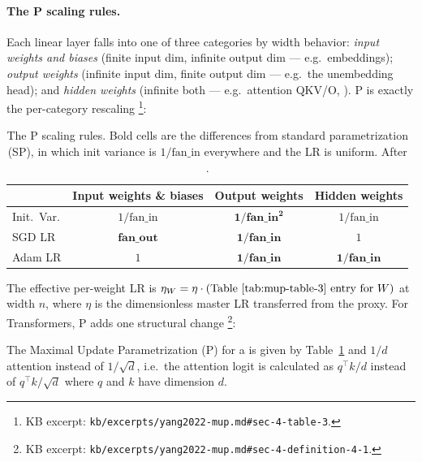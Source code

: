 \paragraph{The \textmu P scaling rules.}
Each linear layer falls into one of three categories by width
behavior: \emph{input weights and biases} (finite input dim, infinite
output dim --- e.g.\ embeddings); \emph{output weights} (infinite
input dim, finite output dim --- e.g.\ the unembedding head); and
\emph{hidden weights} (infinite both --- e.g.\ attention QKV/O,
). \textmu P is exactly the per-category rescaling
\citep[\S 4, Table 3]{yang2022-mup}\footnote{KB excerpt:
\texttt{kb/excerpts/yang2022-mup.md\#sec-4-table-3}.}:

\begin{table}[h]
\centering
\small
\begin{tabular}{lccc}
\toprule
                  & Input weights \& biases & Output weights         & Hidden weights \\
\midrule
Init.\ Var.       & $1/\text{fan\_in}$       & $\mathbf{1/\text{fan\_in}^{2}}$ & $1/\text{fan\_in}$ \\
SGD LR            & $\mathbf{\text{fan\_out}}$ & $\mathbf{1/\text{fan\_in}}$    & $1$ \\
Adam LR           & $1$                       & $\mathbf{1/\text{fan\_in}}$    & $\mathbf{1/\text{fan\_in}}$ \\
\bottomrule
\end{tabular}
\caption{The \textmu P scaling rules. Bold cells are the differences
from standard parametrization (SP), in which init variance is
$1/\text{fan\_in}$ everywhere and the LR is uniform. After
\citet[\S 4, Table 3]{yang2022-mup}.}
\label{tab:mup-table-3}
\end{table}

The effective per-weight LR is $\eta_W = \eta \cdot
(\text{Table~\ref{tab:mup-table-3} entry for } W)$ at width $n$, where
$\eta$ is the dimensionless master LR transferred from the proxy.
For Transformers, \textmu P adds one structural change
\citep[\S 4, Definition 4.1]{yang2022-mup}\footnote{KB excerpt:
\texttt{kb/excerpts/yang2022-mup.md\#sec-4-definition-4-1}.}:

\begin{definition}
The Maximal Update Parametrization (\textmu P) for a  is
given by Table~\ref{tab:mup-table-3} and $1/d$ attention instead of
$1/\sqrt{d}$, i.e.\ the attention logit is calculated as $q^\top k / d$
instead of $q^\top k / \sqrt{d}$ where  $q$ and  $k$ have
dimension $d$.
\end{definition}

